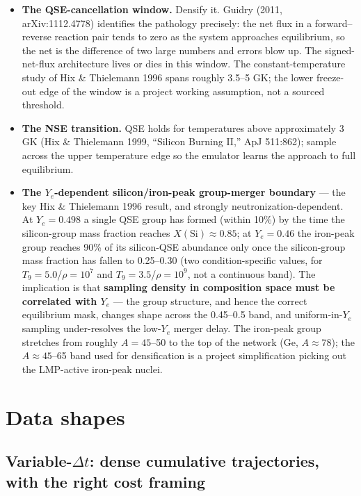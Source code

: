 \documentclass[11pt]{article}
\begin{document}
\begin{itemize}
\item \textbf{The QSE-cancellation window.} Densify it. Guidry (2011, arXiv:1112.4778) identifies the pathology precisely: the net flux in a forward--reverse reaction pair tends to zero as the system approaches equilibrium, so the net is the difference of two large numbers and errors blow up. The signed-net-flux architecture lives or dies in this window. The constant-temperature study of Hix \& Thielemann 1996 spans roughly 3.5--5 GK; the lower freeze-out edge of the window is a project working assumption, not a sourced threshold.
\item \textbf{The NSE transition.} QSE holds for temperatures above approximately 3 GK (Hix \& Thielemann 1999, ``Silicon Burning II,'' ApJ 511:862); sample across the upper temperature edge so the emulator learns the approach to full equilibrium.
\item \textbf{The $Y_e$-dependent silicon/iron-peak group-merger boundary} --- the key Hix \& Thielemann 1996 result, and strongly neutronization-dependent. At $Y_e = 0.498$ a single QSE group has formed (within 10\%) by the time the silicon-group mass fraction reaches $X(\mathrm{Si}) \approx 0.85$; at $Y_e = 0.46$ the iron-peak group reaches 90\% of its silicon-QSE abundance only once the silicon-group mass fraction has fallen to 0.25--0.30 (two condition-specific values, for $T_9 = 5.0$/$\rho = 10^7$ and $T_9 = 3.5$/$\rho = 10^9$, not a continuous band). The implication is that \textbf{sampling density in composition space must be correlated with $Y_e$} --- the group structure, and hence the correct equilibrium mask, changes shape across the 0.45--0.5 band, and uniform-in-$Y_e$ sampling under-resolves the low-$Y_e$ merger delay. The iron-peak group stretches from roughly $A = 45$--50 to the top of the network (Ge, $A \approx 78$); the $A \approx 45$--65 band used for densification is a project simplification picking out the LMP-active iron-peak nuclei.
\end{itemize}

\section{Data shapes}

\subsection{Variable-\texorpdfstring{$\Delta t$}{dt}: dense cumulative trajectories, with the right cost framing}
\end{document}
